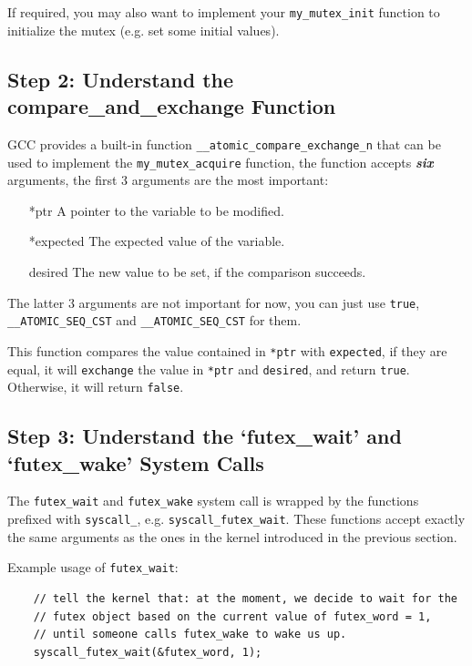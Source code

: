 If required, you may also want to implement your \texttt{my\_mutex\_init} function to initialize
the mutex (e.g. set some initial values).

\subsection{Step 2: Understand the compare\_and\_exchange Function}

GCC provides a built-in function \texttt{\_\_atomic\_compare\_exchange\_n} that
can be used to implement the \texttt{my\_mutex\_acquire} function, the function accepts
\textit{\textbf{six}} arguments, the first 3 arguments are the most important:

\begin{itemize}
    \item[*ptr] A pointer to the variable to be modified.
    \item[*expected] The expected value of the variable.
    \item[desired] The new value to be set, if the comparison succeeds.
\end{itemize}

The latter 3 arguments are not important for now, you can just use \texttt{true},
\texttt{\_\_ATOMIC\_SEQ\_CST} and \texttt{\_\_ATOMIC\_SEQ\_CST} for them.

This function compares the value contained in \texttt{*ptr} with \texttt{expected}, if they
are equal, it will \texttt{exchange} the value in \texttt{*ptr} and \texttt{desired}, and
return \texttt{true}. Otherwise, it will return \texttt{false}.

\subsection{Step 3: Understand the `futex\_wait' and `futex\_wake' System Calls}

The \texttt{futex\_wait} and \texttt{futex\_wake} system call is wrapped by
the functions prefixed with \texttt{syscall\_}, e.g. \texttt{syscall\_futex\_wait}.
These functions accept exactly the same arguments as the ones in the kernel introduced
in the previous section.

Example usage of \texttt{futex\_wait}:

\begin{verbatim}
    // tell the kernel that: at the moment, we decide to wait for the
    // futex object based on the current value of futex_word = 1,
    // until someone calls futex_wake to wake us up.
    syscall_futex_wait(&futex_word, 1);
\end{verbatim}

